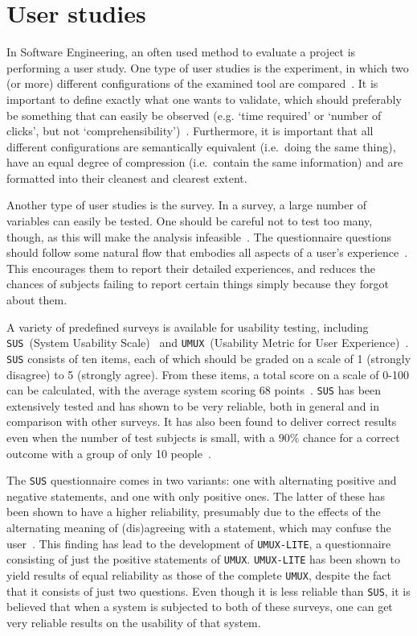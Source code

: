 \section{User studies}
In Software Engineering, an often used method to evaluate a project is performing a user study. One type of user studies is the experiment, in which two (or more) different configurations of the examined tool are compared~\cite{wohlin2003empirical}. It is important to define exactly what one wants to validate, which should preferably be something that can easily be observed (e.g. `time required' or `number of clicks', but not `comprehensibility')~\cite{stein2009assessing}. Furthermore, it is important that all different configurations are semantically equivalent (i.e.\ doing the same thing), have an equal degree of compression (i.e.\ contain the same information) and are formatted into their cleanest and clearest extent.

Another type of user studies is the survey. In a survey, a large number of variables can easily be tested. One should be careful not to test too many, though, as this will make the analysis infeasible~\cite{wohlin2003empirical}. The questionnaire questions should follow some natural flow that embodies all aspects of a user's experience~\cite{tuch2013analyzing}. This encourages them to report their detailed experiences, and reduces the chances of subjects failing to report certain things simply because they forgot about them.

A variety of predefined surveys is available for usability testing, including \verb|SUS|~(System Usability Scale)~\cite{brooke2013sus} and \verb|UMUX|~(Usability Metric for User Experience)~\cite{lewis2013umux}. \verb|SUS| consists of ten items, each of which should be graded on a scale of 1 (strongly disagree) to 5 (strongly agree). From these items, a total score on a scale of 0-100 can be calculated, with the average system scoring 68 points~\cite{sauro2011measuring}. \verb|SUS| has been extensively tested and has shown to be very reliable, both in general and in comparison with other surveys. It has also been found to deliver correct results even when the number of test subjects is small, with a $90\%$ chance for a correct outcome with a group of only 10 people~\cite{tullis2004comparison}.

The \verb|SUS| questionnaire comes in two variants: one with alternating positive and negative statements, and one with only positive ones. The latter of these has been shown to have a higher reliability, presumably due to the effects of the alternating meaning of (dis)agreeing with a statement, which may confuse the user~\cite{lewis2013umux}. This finding has lead to the development of \verb|UMUX-LITE|, a questionnaire consisting of just the positive statements of \verb|UMUX|. \verb|UMUX-LITE| has been shown to yield results of equal reliability as those of the complete \verb|UMUX|, despite the fact that it consists of just two questions. Even though it is less reliable than \verb|SUS|, it is believed that when a system is subjected to both of these surveys, one can get very reliable results on the usability of that system.

